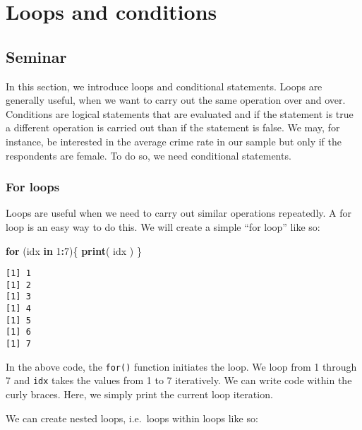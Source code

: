 \documentclass[]{article}
\newenvironment{Shaded}{\begin{snugshade}}{\end{snugshade}}
\newcommand{\ControlFlowTok}[1]{\textcolor[rgb]{0.13,0.29,0.53}{\textbf{#1}}}
\newcommand{\DecValTok}[1]{\textcolor[rgb]{0.00,0.00,0.81}{#1}}
\newcommand{\KeywordTok}[1]{\textcolor[rgb]{0.13,0.29,0.53}{\textbf{#1}}}
\newcommand{\NormalTok}[1]{#1}
\newcommand{\OperatorTok}[1]{\textcolor[rgb]{0.81,0.36,0.00}{\textbf{#1}}}
\begin{document}
\hypertarget{loops-and-conditions}{%
\section{Loops and conditions}\label{loops-and-conditions}}

\hypertarget{seminar-4}{%
\subsection{Seminar}\label{seminar-4}}

In this section, we introduce loops and conditional statements. Loops are generally useful, when we want to carry out the same operation over and over. Conditions are logical statements that are evaluated and if the statement is true a different operation is carried out than if the statement is false. We may, for instance, be interested in the average crime rate in our sample but only if the respondents are female. To do so, we need conditional statements.

\hypertarget{for-loops}{%
\subsubsection{For loops}\label{for-loops}}

Loops are useful when we need to carry out similar operations repeatedly. A for loop is an easy way to do this. We will create a simple ``for loop'' like so:

\begin{Shaded}
\begin{Highlighting}[]
\ControlFlowTok{for}\NormalTok{ (idx }\ControlFlowTok{in} \DecValTok{1}\OperatorTok{:}\DecValTok{7}\NormalTok{)\{}
  \KeywordTok{print}\NormalTok{( idx )}
\NormalTok{\}}
\end{Highlighting}
\end{Shaded}

\begin{verbatim}
[1] 1
[1] 2
[1] 3
[1] 4
[1] 5
[1] 6
[1] 7
\end{verbatim}

In the above code, the \texttt{for()} function initiates the loop. We loop from 1 through 7 and \texttt{idx} takes the values from 1 to 7 iteratively. We can write code within the curly braces. Here, we simply print the current loop iteration.

We can create nested loops, i.e.~loops within loops like so:
\end{document}
